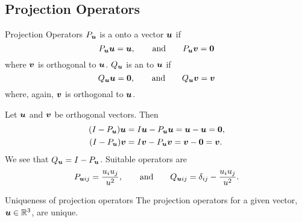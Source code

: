 \subsection{Projection Operators}
\begin{definition}{Projection Operators}{}
    \(P_{\bm{u}}\) is a  onto a vector \(\bm{u}\) if
    \[P_{\bm{u}}\bm{u} = \bm{u}, \qquad\text{and}\qquad P_{\bm{u}}\bm{v} = \bm{0}\]
    where \(\bm{v}\) is orthogonal to \(\bm{u}\).
    \(Q_{\bm{u}}\) is an  to \(\bm{u}\) if
    \[Q_{\bm{u}}\bm{u} = \bm{0}, \qquad\text{and}\qquad Q_{\bm{u}}\bm{v} = \bm{v}\]
    where, again, \(\bm{v}\) is orthogonal to \(\bm{u}\).
\end{definition}
Let \(\bm{u}\) and \(\bm{v}\) be orthogonal vectors.
Then
\begin{align*}
    (I - P_{\bm{u}})\bm{u} &= I\bm{u} - P_{\bm{u}}\bm{u} = \bm{u} - \bm{u} = \bm{0},\\
    (I - P_{\bm{u}})\bm{v} &= I\bm{v} - P_{\bm{u}}\bm{v} = \bm{v} - \bm{0} = \bm{v}.
\end{align*}
We see that \(Q_{\bm{u}} = I - P_{\bm{u}}\).
Suitable operators are
\[P_{\bm{u}ij} = \frac{u_iu_j}{u^2}, \qquad\text{and}\qquad Q_{\bm{u}ij} = \delta_{ij} - \frac{u_iu_j}{u^2}.\]
\begin{lemma}{Uniqueness of projection operators}{}
    The projection operators for a given vector, \(\bm{u}\in\mathbb{R}^3\), are unique.
\end{lemma}
